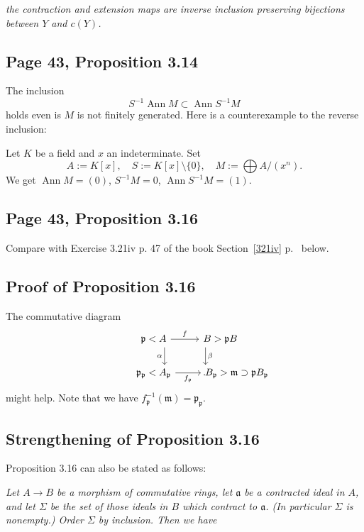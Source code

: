 \documentclass[parskip=half,fontsize=12pt]{scrartcl}%
\newcommand{\oo}{\operatorname}\newcommand{\ooo}{\operatorname*}
\newcommand{\mf}{\mathfrak}
\newcommand{\aaa}{\mf a}
\newcommand{\mmm}{\mf m}
\newcommand{\ppp}{\mf p}
\begin{document}
\emph{the contraction and extension maps are inverse inclusion preserving bijections between $Y$ and $c(Y)$.} 


\subsection{Page 43, Proposition 3.14}%

The inclusion 
$$
S^{-1}\oo{Ann}M\subset\oo{Ann}S^{-1}M
$$ 
holds even is $M$ is not finitely generated. Here is a counterexample to the reverse inclusion:

Let $K$ be a field and $x$ an indeterminate. Set 
$$
A:=K[x],\quad S:=K[x]\setminus\{0\},\quad M:=\bigoplus A/(x^n).
$$ 
We get $\oo{Ann}M=(0)$, $S^{-1}M=0$, $\oo{Ann}S^{-1}M=(1)$. 

\subsection{Page 43, Proposition 3.16}%

Compare with Exercise 3.21iv p. 47 of the book Section~\ref{321iv} p.~\pageref{321iv} below.

\subsection{Proof of Proposition 3.16}

The commutative diagram
$$
\begin{tikzcd}
\kern-22pt\ppp<A\ar[d,"\alpha"']\ar[r,"f"]&B>\ppp B\ar[d,"\beta"]\kern-30pt\\ 
\kern-22pt\ppp_\ppp<A_\ppp\ar[r,"f_\ppp"']&B_\ppp>\mmm\supset\ppp B_\ppp\kern-66pt.
\end{tikzcd}
$$ 
might help. Note that we have $f_\ppp^{-1}(\mmm)=\ppp_\ppp$.


\subsection{Strengthening of Proposition 3.16}\label{43}

Proposition 3.16 can also be stated as follows:

\emph{Let $A\to B$ be a morphism of commutative rings, let $\aaa$ be a contracted ideal in $A$, and let $\Sigma$ be the set of those ideals in $B$ which contract to $\aaa$. (In particular $\Sigma$ is nonempty.) Order $\Sigma$ by inclusion. Then we have}
\end{document}
